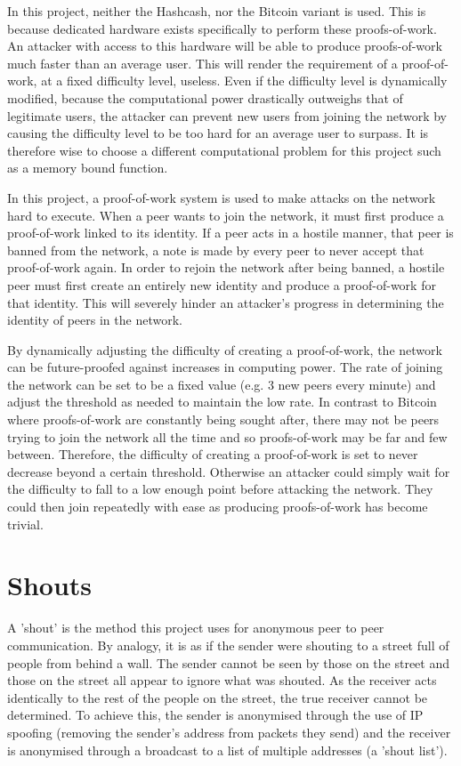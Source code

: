 \documentclass[ %
                    author={Luke Murray},
                supervisor={Dr. Simon Hollis},
                     title={Shadow Peer-to-Peer Networks},
                  subtitle={},
                    degree={MEng},
                      year={2013} ]{thesis}
\begin{document}
In this project, neither the Hashcash, nor the Bitcoin variant is used. This is because dedicated hardware\cite{avalonasic} exists specifically to perform these proofs-of-work. An attacker with access to this hardware will be able to produce proofs-of-work much faster than an average user. This will render the requirement of a proof-of-work, at a fixed difficulty level, useless. Even if the difficulty level is dynamically modified, because the computational power drastically outweighs that of legitimate users, the attacker can prevent new users from joining the network by causing the difficulty level to be too hard for an average user to surpass. It is therefore wise to choose a different computational problem for this project such as a memory bound function\cite{abadi2005moderately}.

In this project, a proof-of-work system is used to make attacks on the network hard to execute. When a peer wants to join the network, it must first produce a proof-of-work linked to its identity. If a peer acts in a hostile manner, that peer is banned from the network, a note is made by every peer to never accept that proof-of-work again. In order to rejoin the network after being banned, a hostile peer must first create an entirely new identity and produce a proof-of-work for that identity. This will severely hinder an attacker's progress in determining the identity of peers in the network.

By dynamically adjusting the difficulty of creating a proof-of-work, the network can be future-proofed against increases in computing power. The rate of joining the network can be set to be a fixed value (e.g. 3 new peers every minute) and adjust the threshold as needed to maintain the low rate. In contrast to Bitcoin where proofs-of-work are constantly being sought after, there may not be peers trying to join the network all the time and so proofs-of-work may be far and few between. Therefore, the difficulty of creating a proof-of-work is set to never decrease beyond a certain threshold. Otherwise an attacker could simply wait for the difficulty to fall to a low enough point before attacking the network. They could then join repeatedly with ease as producing proofs-of-work has become trivial.

\section{Shouts}

A 'shout' is the method this project uses for anonymous peer to peer communication. By analogy, it is as if the sender were shouting to a street full of people from behind a wall. The sender cannot be seen by those on the street and those on the street all appear to ignore what was shouted. As the receiver acts identically to the rest of the people on the street, the true receiver cannot be determined. To achieve this, the sender is anonymised through the use of IP spoofing (removing the sender's address from packets they send) and the receiver is anonymised through a broadcast to a list of multiple addresses (a 'shout list').
\end{document}
